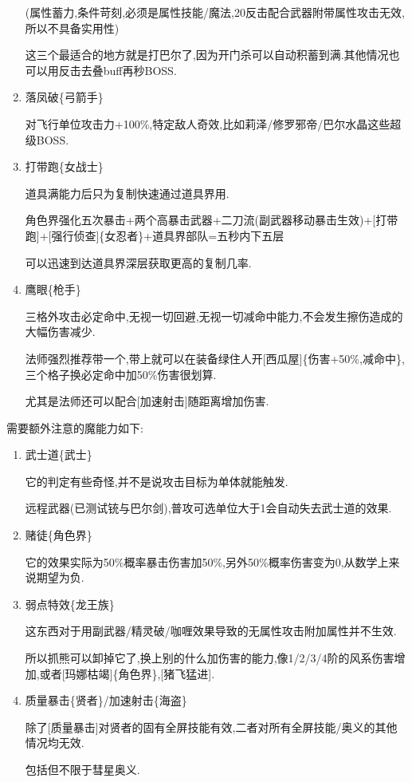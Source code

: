 \begin{enumerate}
		(属性蓄力,条件苛刻,必须是属性技能/魔法,20反击配合武器附带属性攻击无效,所以不具备实用性)

		这三个最适合的地方就是打巴尔了,因为开门杀可以自动积蓄到满.其他情况也可以用反击去叠buff再秒BOSS.

		\item
		落凤破\{弓箭手\}

		对飞行单位攻击力+100\%,特定敌人奇效,比如莉泽/修罗邪帝/巴尔水晶这些超级BOSS.

		\item
		打带跑\{女战士\}

		道具满能力后只为复制快速通过道具界用.

		角色界强化五次暴击+两个高暴击武器+二刀流(副武器移动暴击生效)+[打带跑]+[强行侦查]\{女忍者\}+道具界部队=五秒内下五层

		可以迅速到达道具界深层获取更高的复制几率.

		\item
		鹰眼\{枪手\}

		三格外攻击必定命中,无视一切回避,无视一切减命中能力,不会发生擦伤造成的大幅伤害减少.

		法师强烈推荐带一个,带上就可以在装备绿住人开[西瓜屋]\{伤害+50\%,减命中\},三个格子换必定命中加50\%伤害很划算.

		尤其是法师还可以配合[加速射击]随距离增加伤害.


	\end{enumerate}

	\newpage

	需要额外注意的魔能力如下:

	\begin{enumerate}

		\item
		武士道\{武士\}

		它的判定有些奇怪,并不是说攻击目标为单体就能触发.

		远程武器(已测试铳与巴尔剑),普攻可选单位大于1会自动失去武士道的效果.

		\item
		赌徒\{角色界\}

		它的效果实际为50\%概率暴击伤害加50\%,另外50\%概率伤害变为0,从数学上来说期望为负.

		\item
		弱点特效\{龙王族\}

		这东西对于用副武器/精灵破/咖喱效果导致的无属性攻击附加属性并不生效.

		所以抓熊可以卸掉它了,换上别的什么加伤害的能力,像1/2/3/4阶的风系伤害增加,或者[玛娜枯竭]\{角色界\},[猪飞猛进].

		\item
		质量暴击\{贤者\}/加速射击\{海盗\}

		除了[质量暴击]对贤者的固有全屏技能有效,二者对所有全屏技能/奥义的其他情况均无效.

		包括但不限于彗星奥义.

	\end{enumerate}
	